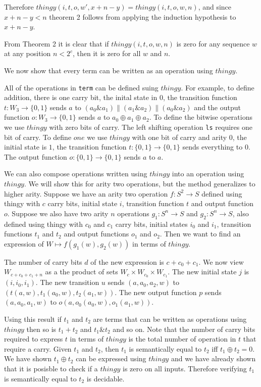 \documentclass[12pt]{article} %
\theoremstyle{definition}
\theoremstyle{definition}
\theoremstyle{definition}
\theoremstyle{definition}
\begin{document}
Therefore $thingy(i, t, o, w', x + n - y) = thingy(i, t, o, w, n)$, and since
$x + n - y < n$ theorem 2 follows from applying the induction hypothesis to
$x + n - y$.

From Theorem 2 it is clear that if $thingy(i, t, o, w, n)$ is zero for
any sequence $w$ at any position $n < 2^c$, then it is zero for all $w$ and $n$.

We now show that every term can be written as an operation using $thingy$.

All of the operations in \lstinline{term} can be defined suing $thingy$. For example,
to define addition, there is one carry bit, the inital state in $0$, the transition
function $t : W_3 \rightarrow \{0, 1\}$ sends $a$ to $(a_0 \& a_1) \| (a_1 \& a_2) \| (a_0 \& a_2)$
and the output function $o : W_3 \rightarrow \{0, 1\}$ sends $a$ to $a_0 \oplus a_1 \oplus a_2$.
To define the bitwise operations we use $thingy$ with zero bits of carry.
The left shifting operation \lstinline{ls} requires one bit of carry. To define
$one$ we use $thingy$ with one bit of carry and arity $0$,
the initial state is $1$, the transition function $t : \{0, 1\} \rightarrow \{0, 1\}$ sends
everything to $0$. The output function $o : \{0, 1\} \rightarrow \{0, 1\}$ sends $a$ to $a$.

We can also compose operations written using $thingy$ into an operation using $thingy$.
We will show this for arity two operations, but the method generalizes to higher arity.
Suppose we have an arity two operation $f : S^2 \rightarrow S$ defined using thingy with
$c$ carry bits, initial state $i$, transition function $t$ and output function $o$.
Suppose we also have two arity $n$ operations $g_1 : S^n \rightarrow S$ and $g_2 : S^n \rightarrow S$,
also defined using thingy with $c_0$ and $c_1$ carry bits,
initial states $i_0$ and $i_1$, transition functions $t_1$ and $t_2$ and output functions $o_1$ and $o_2$.
Then we want to find an expression of $W \mapsto f(g_1(w), g_2(w))$ in terms of $thingy$.

The number of carry bits $d$ of the new expression is $c + c_0 + c_1$.
We now view $W_{c + c_0 + c_1 + n}$ as a the product of sets $W_c \times W_{c_0} \times W_{c_1}$.
The new initial state $j$ is $(i, i_0, i_1)$.
The new transition $u$ sends $(a, a_0, a_2, w)$ to $(t(a, w), t_1(a_0, w), t_2(a_1, w))$.
The new output function $p$ sends $(a, a_0, a_1, w)$ to $o(a, o_0(a_0, w), o_1(a_1, w))$.

Using this result if $t_1$ and $t_2$ are terms that can be written as operations
using $thingy$ then so is $t_1 + t_2$ and $t_1 \& t_2$ and so on. Note that the
number of carry bits required to express $t$ in terms of $thingy$ is the
total number of operation in $t$ that require a carry. Given $t_1$ and $t_2$, then
$t_1$ is semantically equal to $t_2$ iff $t_1 \oplus t_2 = 0$.
We have shown $t_1 \oplus t_2$ can be expressed using $thingy$ and we have already
shown that it is posisble to check if a $thingy$ is zero on all inputs.
Therefore verifying $t_1$ is semantically equal to $t_2$ is decidable.
\end{document}
